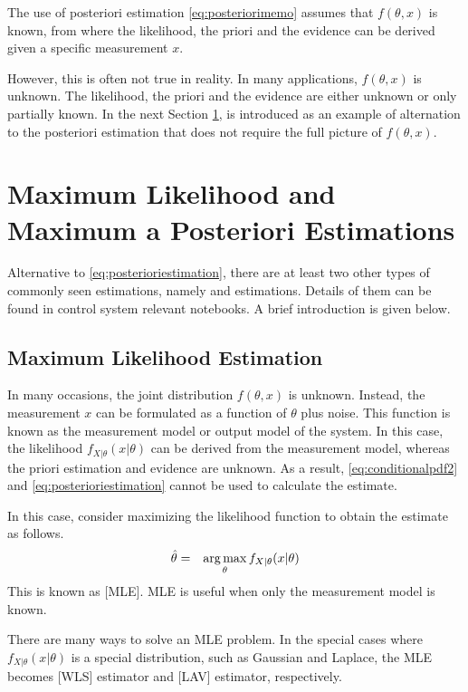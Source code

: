 The use of posteriori estimation \eqref{eq:posteriorimemo} assumes that $f(\theta, x)$ is known, from where the likelihood, the priori and the evidence can be derived given a specific measurement $x$. 

However, this is often not true in reality. In many applications, $f(\theta, x)$ is unknown. The likelihood, the priori and the evidence are either unknown or only partially known. In the next Section \ref{sec:mlemap},  is introduced as an example of alternation to the posteriori estimation that does not require the full picture of $f(\theta, x)$.

\section{Maximum Likelihood and Maximum a Posteriori Estimations} \label{sec:mlemap}

Alternative to \eqref{eq:posterioriestimation}, there are at least two other types of commonly seen estimations, namely  and  estimations. Details of them can be found in control system relevant notebooks. A brief introduction is given below.

\subsection{Maximum Likelihood Estimation}

In many occasions, the joint distribution $f(\theta, x)$ is unknown. Instead, the measurement $x$ can be formulated as a function of $\theta$ plus noise. This function is known as the measurement model or output model of the system. In this case, the likelihood $f_{X|\theta}(x|\theta)$ can be derived from the measurement model, whereas the priori estimation and evidence are unknown. As a result, \eqref{eq:conditionalpdf2} and \eqref{eq:posterioriestimation} cannot be used to calculate the estimate.

In this case, consider maximizing the likelihood function to obtain the estimate as follows.
\begin{eqnarray}
	\hat{\theta} &=& \operatorname*{arg\,max}_\theta f_{X|\theta}(x|\theta) \nonumber
\end{eqnarray}
This is known as [MLE]. MLE is useful when only the measurement model is known.

There are many ways to solve an MLE problem. In the special cases where $f_{X|\theta}(x|\theta)$ is a special distribution, such as Gaussian and Laplace, the MLE becomes [WLS] estimator and [LAV] estimator, respectively.

